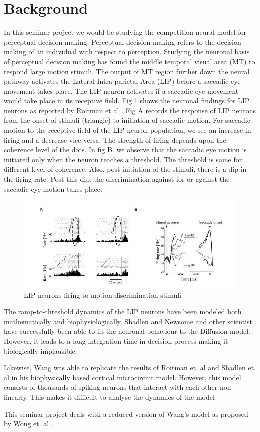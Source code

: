 \chapter{Background}

In this seminar project we would be studying the competition neural model for perceptual decision making. Perceptual decision making refers to the decision making of an individual with respect to perception. Studying the neuronal basis of perceptual decision making has found the middle temporal visual area (MT) to respond large motion stimuli. The output of MT region further down the neural pathway activates the Lateral Intra-parietal Area (LIP) before a saccadic eye movement takes place. The LIP neuron activates if a saccadic eye movement would take place in its receptive field. Fig 1 shows the neuronal findings for LIP neurons as reported by Roitman et al \cite{roitman2002response}. Fig A records the response of LIP neurons from the onset of stimuli (triangle) to initiation of saccadic motion. For saccadic motion to the receptive field of the LIP neuron population, we see an increase in firing and a decrease vice versa. The strength of firing depends upon the coherence level of the dots. In fig B. we observe that the saccadic eye motion is initiated only when the neuron reaches a threshold. The threshold is same for different level of coherence. Also, post initiation of the stimuli, there is a dip in the firing rate. Post this dip, the discrimination against for or against the saccadic eye motion takes place.

\begin{figure}
  \includegraphics[width=\linewidth]{fig/LIP.jpg}
  \caption{LIP neurons firing to motion discrimination stimuli}
  \label{fig:LIP neuron activity}
\end{figure}

The ramp-to-threshold dynamics of the LIP neurons have been modeled both mathematically and biophysiologically. Shadlen and Newsome \cite{shadlen2001neural} and other scientist have successfully been able to fit the neuronal behaviour to the Diffusion model. However, it leads to a long integration time in decision process making it biologically implausible. 

Likewise, Wang \cite{wang2002probabilistic} was able to replicate the results of Roitman et. al\cite{roitman2002response} and Shadlen et. al \cite{shadlen2001neural} in his biophysically based cortical microcircuit model. However, this model consists of thousands of spiking neurons that interact with each other non linearly. This makes it difficult to analyse the dynamics of the model

This seminar project deals with a reduced version of Wang's model as proposed by Wong et. al \cite{wong2006recurrent}.
